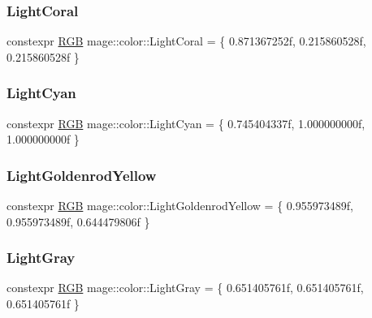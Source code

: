 \mbox{\label{namespacemage_1_1color_ad8d2691e5afda566e2310392eff4d591}} 
\subsubsection{\texorpdfstring{Light\+Coral}{LightCoral}}
{\footnotesize\ttfamily constexpr \mbox{\hyperlink{structmage_1_1_r_g_b}{R\+GB}} mage\+::color\+::\+Light\+Coral = \{ 0.\+871367252f, 0.\+215860528f, 0.\+215860528f \}}

\mbox{\label{namespacemage_1_1color_a33ec927401f051a6271841f78e67564f}} 
\subsubsection{\texorpdfstring{Light\+Cyan}{LightCyan}}
{\footnotesize\ttfamily constexpr \mbox{\hyperlink{structmage_1_1_r_g_b}{R\+GB}} mage\+::color\+::\+Light\+Cyan = \{ 0.\+745404337f, 1.\+000000000f, 1.\+000000000f \}}

\mbox{\label{namespacemage_1_1color_a60013d7d47356017384ab70bf9a6e1ac}} 
\subsubsection{\texorpdfstring{Light\+Goldenrod\+Yellow}{LightGoldenrodYellow}}
{\footnotesize\ttfamily constexpr \mbox{\hyperlink{structmage_1_1_r_g_b}{R\+GB}} mage\+::color\+::\+Light\+Goldenrod\+Yellow = \{ 0.\+955973489f, 0.\+955973489f, 0.\+644479806f \}}

\mbox{\label{namespacemage_1_1color_aadf052403392216e671d0ac1b18d1909}} 
\subsubsection{\texorpdfstring{Light\+Gray}{LightGray}}
{\footnotesize\ttfamily constexpr \mbox{\hyperlink{structmage_1_1_r_g_b}{R\+GB}} mage\+::color\+::\+Light\+Gray = \{ 0.\+651405761f, 0.\+651405761f, 0.\+651405761f \}}

